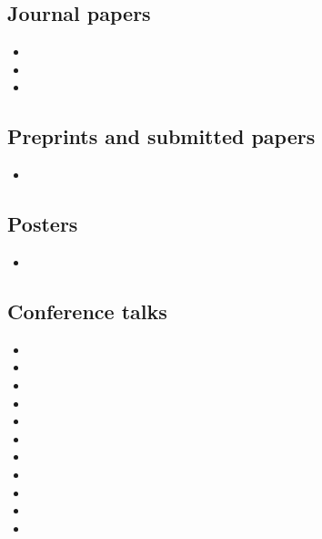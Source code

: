 \documentclass{scrartcl}
\begin{document}
\subsection*{Journal papers}

\begin{itemize}
  \item {}
  \item {}
  \item {}
\end{itemize}

\subsection*{Preprints and submitted papers}
\label{sec:Prepr-subm-papers}

\begin{itemize}
  \item {}
\end{itemize}

\subsection*{Posters}

\begin{itemize}
  \item {}
\end{itemize}

\subsection*{Conference talks}
\label{sec:Quelq-autr-expos}

\begin{itemize}
  \item {}
  \item {}
  \item {}
  \item {}
  \item {}
  \item {}
  \item {}
  \item {}
  \item {}
  \item {}
  \item {}
\end{itemize}
\end{document}
